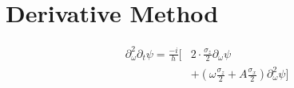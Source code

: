 \documentclass[
  amsfonts,
  amsmath,
  tbtags,
  amssymb,
  aps,
  nobibnotes,
  twocolumn,
]{revtex4-2}
\begin{document}
\section{Derivative Method}
\begin{equation}
  \begin{aligned}
    \partial_{\omega}^{2} \partial_{t} \psi
    = \frac{-i}{h} [&2 \cdot \frac{\sigma_{z}}{2} \partial_{\omega} \psi\\
      &+ (\omega \frac{\sigma_{z}}{2} + A \frac{\sigma_{x}}{2}) \partial_{\omega}^{2} \psi]
  \end{aligned}
\end{equation}



\end{document}
